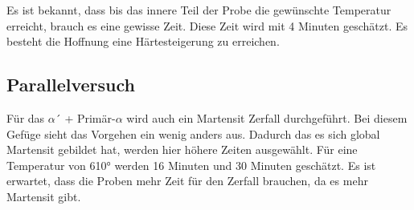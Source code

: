 Es ist bekannt, dass bis das innere Teil der Probe die gewünschte Temperatur erreicht, brauch es eine gewisse Zeit. Diese Zeit wird mit 4 Minuten geschätzt. Es besteht die Hoffnung eine Härtesteigerung zu erreichen.



\subsection{Parallelversuch}

Für das $\alpha$´ + Primär-$\alpha$ wird auch ein Martensit Zerfall durchgeführt. Bei diesem Gefüge sieht das Vorgehen ein wenig anders aus. Dadurch das es sich global Martensit gebildet hat, werden hier höhere Zeiten ausgewählt. Für eine Temperatur von 610° werden 16 Minuten und 30 Minuten geschätzt. Es ist erwartet, dass die Proben mehr Zeit für den Zerfall brauchen, da es mehr Martensit gibt. 

